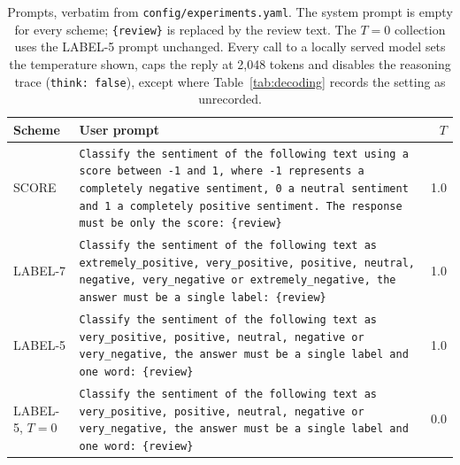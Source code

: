 \begin{table}[htbp]
\centering
\caption{Prompts, verbatim from \texttt{config/experiments.yaml}. The system prompt is empty for every scheme; \texttt{\{review\}} is replaced by the review text. The $T = 0$ collection uses the LABEL-5 prompt unchanged. Every call to a locally served model sets the temperature shown, caps the reply at 2{,}048 tokens and disables the reasoning trace (\texttt{think: false}), except where Table~\ref{tab:decoding} records the setting as unrecorded.}
\label{tab:prompts}
\small
\begin{tabular}{lp{}r}
\toprule
\textbf{Scheme} & \textbf{User prompt} & \textbf{$T$} \\
\midrule
  SCORE & \texttt{Classify the sentiment of the following text using a score between -1 and 1, where -1 represents a completely negative sentiment, 0 a neutral sentiment and 1 a completely positive sentiment. The response must be only the score:  \{review\}} & 1.0 \\
  LABEL-7 & \texttt{Classify the sentiment of the following text as extremely\_positive, very\_positive, positive, neutral, negative, very\_negative or extremely\_negative, the answer must be a single label:  \{review\}} & 1.0 \\
  LABEL-5 & \texttt{Classify the sentiment of the following text as very\_positive, positive, neutral, negative or very\_negative, the answer must be a single label and one word:  \{review\}} & 1.0 \\
  LABEL-5, $T = 0$ & \texttt{Classify the sentiment of the following text as very\_positive, positive, neutral, negative or very\_negative, the answer must be a single label and one word:  \{review\}} & 0.0 \\
\bottomrule
\end{tabular}
\end{table}
